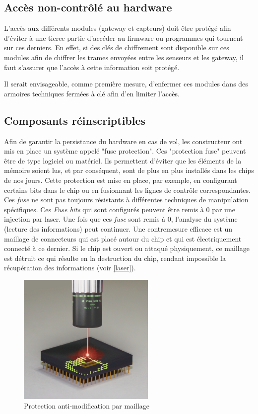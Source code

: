 \documentclass[12pt]{article}
\begin{document}
\subsection{Accès non-contrôlé au hardware}
\label{ssec:cm-acceshardware}

L'accès aux différents modules (gateway et capteurs) doit être protégé afin d'éviter à une tierce partie d'accéder au firmware ou programmes qui tournent sur ces derniers. En effet, si des clés de chiffrement sont disponible sur ces modules afin de chiffrer les trames envoyées entre les senseurs et les gateway, il faut s'assurer que l'accès à cette information soit protégé.

Il serait envisageable, comme première mesure, d'enfermer ces modules dans des armoires techniques fermées à clé afin d'en limiter l'accès.

\subsection{Composants réinscriptibles}
\label{ssec:cm-fuse}

Afin de garantir la persistance du hardware en cas de vol, les constructeur ont mis en place un système appelé "fuse protection". Ces "protection fuse" peuvent être de type logiciel ou matériel. Ils permettent d'éviter que les éléments de la mémoire soient lus, et par conséquent, sont de plus en plus installés dans les chips de nos jours. Cette protection est mise en place, par exemple, en configurant certains bits dans le chip ou en fusionnant les lignes de contrôle correspondantes. Ces \textit{fuse} ne sont pas toujours résistants à différentes techniques de manipulation spécifiques. Ces \textit{Fuse bits} qui sont configurés peuvent être remis à 0 par une injection par laser. Une fois que ces \textit{fuse} sont remis à 0, l'analyse du système (lecture des informations) peut continuer. Une contremesure efficace est un maillage de connecteurs qui est placé autour du chip et qui est électriquement connecté à ce dernier. Si le chip est ouvert ou attaqué physiquement, ce maillage est détruit ce qui résulte en la destruction du chip, rendant impossible la récupération des informations (voir \autoref{laser}).

\begin{figure}[!h]
	\centering
	\includegraphics[width=250px]{laserattack.png}
	\caption{Protection anti-modification par maillage}
	\label{laser}
\end{figure}
\end{document}
